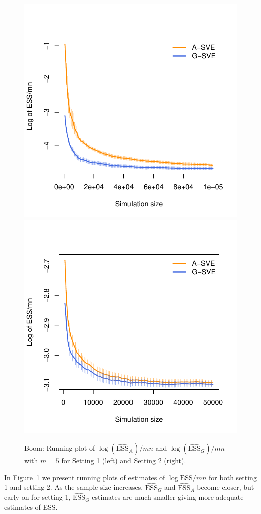 \documentclass[11pt]{article}
\theoremstyle{remark}
\begin{document}
\begin{figure}[h]
    \centering
      \includegraphics[width = .35\textwidth]{plots/boom-ess_1_3_8_m5.pdf}
      \includegraphics[width = .35\textwidth]{plots/boom-ess_1_10_7_m5.pdf}          

    \caption{Boom: Running plot of $\log (\widehat{\text{ESS}}_A )/mn$ and $\log (\widehat{\text{ESS}}_G )/mn$ with $m = 5$ for Setting 1 (left) and Setting 2 (right).}
    \label{fig:boom-ess}
\end{figure}

In Figure~\ref{fig:boom-ess} we present running plots of estimates of $\log \textrm{ESS}/mn$ for both setting 1 and setting 2. As the sample size increases, $\widehat{\text{ESS}}_G$ and  $\widehat{\text{ESS}}_A$ become closer, but early on for setting 1, $\widehat{\text{ESS}}_G$ estimates are much smaller giving more adequate estimates of ESS. 

\end{document}
